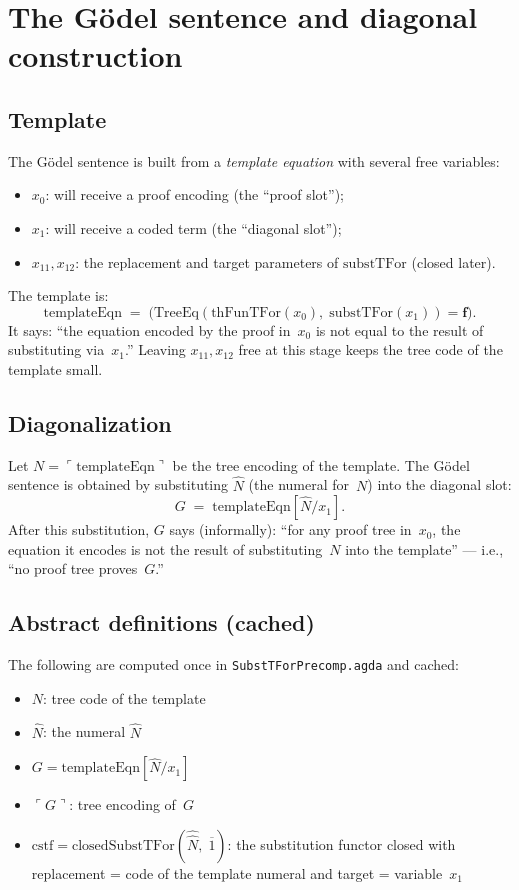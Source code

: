 \documentclass[11pt]{article}
\newcommand{\falseT}{\mathbf{f}}
\newcommand{\nat}[1]{\overline{#1}}
\newcommand{\code}[1]{\ulcorner #1 \urcorner}
\newcommand{\reify}[1]{\widehat{#1}}
\newcommand{\thFunTFor}{\mathrm{thFunTFor}}
\newcommand{\cstf}{\mathrm{cstf}}
\newcommand{\TreeEq}{\mathrm{TreeEq}}
\begin{document}
\section{The G\"odel sentence and diagonal construction}

\subsection*{Template}

The G\"odel sentence is built from a \emph{template equation}
with several free variables:
\begin{itemize}
\item $x_0$: will receive a proof encoding (the ``proof slot'');
\item $x_1$: will receive a coded term (the ``diagonal slot'');
\item $x_{11}, x_{12}$: the replacement and target parameters of
  $\mathrm{substTFor}$ (closed later).
\end{itemize}

The template is:
\[
  \mathrm{templateEqn} \;=\;
  \bigl(\TreeEq(\thFunTFor(x_0),\;
    \mathrm{substTFor}(x_1)) = \falseT\bigr).
\]
It says: ``the equation encoded by the proof in~$x_0$ is not equal
to the result of substituting via~$x_1$.''
Leaving $x_{11}, x_{12}$ free at this stage keeps the tree code
of the template small.

\subsection*{Diagonalization}

Let $N = \code{\mathrm{templateEqn}}$ be the tree
encoding of the template.  The G\"odel sentence is obtained by
substituting $\hat{N}$ (the numeral for~$N$) into the diagonal slot:
\[
  G \;=\; \mathrm{templateEqn}[\hat{N}/x_1].
\]
After this substitution, $G$ says (informally):
``for any proof tree in~$x_0$, the equation it encodes is not the
result of substituting~$N$ into the template'' ---
i.e., ``no proof tree proves~$G$.''

\subsection*{Abstract definitions (cached)}

The following are computed once in \texttt{SubstTForPrecomp.agda}
and cached:
\begin{itemize}
\item $N$: tree code of the template
\item $\hat N$: the numeral $\reify{N}$
\item $G = \mathrm{templateEqn}[\hat{N}/x_1]$
\item $\code{G}$: tree encoding of~$G$
\item $\cstf = \mathrm{closedSubstTFor}(\reify{\hat N},\;\nat{1})$:
  the substitution functor closed with replacement = code of the
  template numeral and target = variable~$x_1$
\end{itemize}
\end{document}
